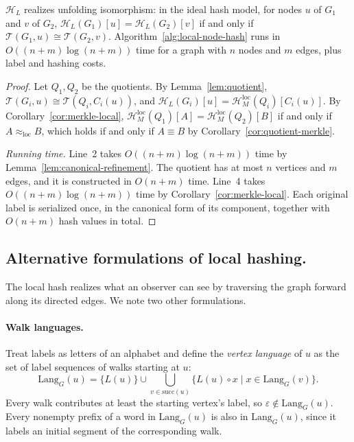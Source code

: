 \documentclass[twoside,leqno]{article}
\newcommand{\HL}{\mathcal{H}_{L}}
\newcommand{\HMl}{\mathcal{H}_{M}^{\mathrm{loc}}}
\newcommand{\eql}{\approx_{\mathrm{loc}}}
\newcommand{\Succ}{\mathrm{succ}}
\newcommand{\Unf}{\mathcal{T}}
\newcommand{\iso}{\cong}
\begin{document}
\begin{theorem}
\label{thm:localhashcorrect}
$\HL$ realizes unfolding isomorphism: in the ideal hash model, for nodes $u$ of $G_1$ and $v$ of $G_2$, $\HL(G_1)[u] = \HL(G_2)[v]$ if and only if $\Unf(G_1, u) \iso \Unf(G_2, v)$. Algorithm~\ref{alg:local-node-hash} runs in $O((n+m)\log(n+m))$ time for a graph with $n$ nodes and $m$ edges, plus label and hashing costs.
\end{theorem}
\begin{proof}
Let $Q_1,Q_2$ be the quotients. By Lemma~\ref{lem:quotient}, $\Unf(G_i,u)\iso\Unf(Q_i,C_i(u))$, and $\HL(G_i)[u]=\HMl(Q_i)[C_i(u)]$. By Corollary~\ref{cor:merkle-local}, $\HMl(Q_1)[A]=\HMl(Q_2)[B]$ if and only if $A\eql B$, which holds if and only if $A\equiv B$ by Corollary~\ref{cor:quotient-merkle}.

\emph{Running time.} Line~2 takes $O((n+m)\log(n+m))$ time by Lemma~\ref{lem:canonical-refinement}. The quotient has at most $n$ vertices and $m$ edges, and it is constructed in $O(n+m)$ time. Line~4 takes $O((n+m)\log(n+m))$ time by Corollary~\ref{cor:merkle-local}. Each original label is serialized once, in the canonical form of its component, together with $O(n+m)$ hash values in total.
\end{proof}

\subsection{Alternative formulations of local hashing.}
The local hash realizes what an observer can see by traversing the graph forward along its directed edges. We note two other formulations.

\paragraph{Walk languages.} Treat labels as letters of an alphabet and define the \emph{vertex language} of $u$ as the set of label sequences of walks starting at $u$:
\begin{equation}
  \text{Lang}_G(u) = \{L(u)\} \cup \bigcup_{v \in \Succ(u)} \{L(u) \circ x \mid x \in \text{Lang}_G(v)\}.
\end{equation}
Every walk contributes at least the starting vertex's label, so $\varepsilon\notin\text{Lang}_G(u)$. Every nonempty prefix of a word in $\text{Lang}_G(u)$ is also in $\text{Lang}_G(u)$, since it labels an initial segment of the corresponding walk.
\end{document}
